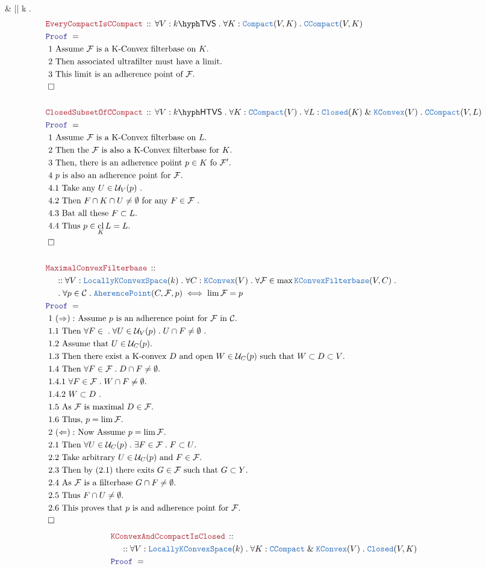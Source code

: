 \documentclass[12pt]{scrartcl}
\newcommand{\TYPE}[1]{\textcolor{NavyBlue}{\mathtt{#1}}}
\newcommand{\LOGIC}[1]{\textcolor{Blue}{\mathtt{#1}}}
\newcommand{\THM}[1]{\textcolor{Maroon}{\mathtt{#1}}}
\renewcommand{\.}{\; . \;}
\newcommand{\Theorem}[2]{& \THM{#1} \, :: \, #2 \\ & \Proof = \\ }
\newcommand{\NewLine}{\\ & \kern 1pc}
\newcommand{\Page}[1]{ \begin{align*} #1 \end{align*}   }
\newcommand{\Explain}[1]{& \text{#1.} \\}
\renewcommand{\And}{\; \& \;}
\newcommand{\QED}{\; \square}
\newcommand{\EndProof}{& \QED \\}
\newcommand{\Proof}{\LOGIC{Proof} \; }
\renewcommand{\C}{\mathcal{C}}
\newcommand{\Closed}{\TYPE{Closed}}
\newcommand{\Compact}{\TYPE{Compact}}
\DeclareMathOperator*{\cl}{cl}
\renewcommand{\U}{\mathcal{U}}
\newcommand{\F}{\mathcal{F}}
\newcommand{\KC}{\TYPE{KConvex}}
\newcommand{\LKConv}{\TYPE{LocallyKConvexSpace}}
\newcommand{\CCompact}{\TYPE{CCompact}}
\newcommand{\TVS}[1]{{#1}\hyph\mathsf{TVS}}
\newcommand{\HTVS}[1]{{#1}\hyph\mathsf{HTVS}}
\begin{document}
{{	} 
	\\
	& |\cdot| \neq  \Lambda \alpha \in k \. [\alpha \neq 0] \\ 
}\Page{
	\Theorem{EveryCompactIsCCompact}
	{
		\forall V : \TVS{k} \. 
		\forall K : \Compact(V,K) \.
		 \CCompact(V,K)
	}
	\Explain{ 1 Assume $\F$ is a K-Convex filterbase on $K$}
	\Explain{ 2 Then associated ultrafilter must have a limit}
	\Explain{ 3 This limit is an adherence point of $\F$}
	\EndProof
	\\
	\Theorem{ClosedSubsetOfCCompact}
	{	
		\forall V : \HTVS{k} \.
		\forall K  : \CCompact(V) \.
		\forall L : \Closed(K) \And \KC(V) \.
		\CCompact(V,L)
	}
	\Explain{ 1 Assume $\F$ is a K-Convex filterbase on $L$}
	\Explain{ 2 Then the $\F$ is also a K-Convex filterbase for $K$}
	\Explain{ 3 Then, there is an adherence poiint $p \in K$ fo $\F'$}
	\Explain{ 4 $p$ is also an adherence point for $\F$}
	\Explain{ 4.1  Take any $U \in \U_V(p)$  }
	\Explain{ 4.2  Then $F \cap K \cap U \neq \emptyset$ for any $F \in \F$ }
	\Explain{ 4.3  Bat  all these $F \subset L$}
	\Explain{ 4.4 Thus $p \in \cl_K L = L$}
	\EndProof
	\\
	\Theorem{MaximalConvexFilterbase}
	{
		\NewLine :: 			
		\forall V : \LKConv(k) \.
		\forall C : \KC(V) \.
		\forall \F \in \max \TYPE{KConvexFilterbase}(V,C) \. \NewLine \.
		\forall p \in \C \.
		\TYPE{AherencePoint}(C,\F, p)
		\iff
		\lim \F = p
	}
	\Explain{ 1  $(\Rightarrow):$ Assume $p$ is an adherence point for $\F$ in $\C$}
	\Explain{ 1.1 Then $\forall F \in \. \forall U \in \U_V(p) \. U \cap F \neq \emptyset$ }
	\Explain{ 1.2 Assume that $U \in \U_C(p)$}
	\Explain{ 1.3 Then there exist a K-convex $D$ and open $W \in \U_C(p)$ 
	such that $W \subset D \subset V$}
	\Explain{ 1.4 Then $\forall F \in \F \.  D \cap F  \neq \emptyset$}
	\Explain{ 1.4.1 $\forall F \in \F \.  W \cap F \neq \emptyset$}
	\Explain{ 1.4.2 $W \subset D$ }
	\Explain{ 1.5 As $\F$ is maximal $D \in \F$}
	\Explain{ 1.6 Thus, $p = \lim \F$}
	\Explain{ 2 $(\Leftarrow):$ Now Assume $p = \lim \F$}
	\Explain{ 2.1 Then  $\forall U \in \U_C(p) \. \exists F \in \F \. F \subset U$}
	\Explain{ 2.2 Take arbitrary $U \in \U_C(p)$ and $F \in \F$}
	\Explain{ 2.3 Then by $(2.1)$ there exits $G \in \F$ such that $G \subset Y$}
	\Explain{ 2.4 As $\F$ is a filterbase $G \cap F \neq \emptyset$}
	\Explain{ 2.5 Thus $F \cap U \neq \emptyset$}
	\Explain{ 2.6 This proves that $p$ is and adherence point for $\F$}
	\EndProof
}\Page{
	\Theorem{KConvexAndCcompactIsClosed}
	{
		\NewLine ::		
		\forall V : \LKConv(k) \.
		\forall K : \CCompact \And \KC(V) \.
		\Closed(V,K)
}}
\end{document}
